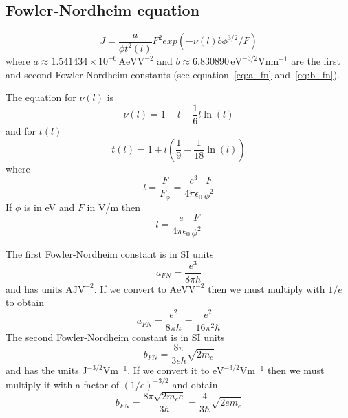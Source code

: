 \documentclass[a4paper,10pt]{article}
\begin{document}
\subsection{Fowler-Nordheim equation}
\begin{equation}
  J = \frac{a}{\phi t^2(l)}F^2 exp(-\nu(l)b\phi^{3/2}/F)
\end{equation}
where \(a \approx 1.541434\times 10^{-6}\,\mathrm{AeVV^{-2}}\) and \(b \approx 6.830890\,\mathrm{eV^{-3/2} V nm^{-1}}\) are
the first and second Fowler-Nordheim constants (see equation~\eqref{eq:a_fn} and~\eqref{eq:b_fn}).

The equation for \(\nu(l)\) is~\cite{Forbes08112007}
\begin{equation}
 \nu(l) = 1 - l + \frac{1}{6}l \ln(l)
\end{equation}
and for \(t(l)\)
\begin{equation}
  t(l) = 1 + l\left( \frac{1}{9} - \frac{1}{18}\ln(l) \right)
\end{equation}
where
\begin{equation}
 l = \frac{F}{F_\phi} = \frac{e^3}{4\pi\epsilon_0} \frac{F}{\phi^2}
\end{equation}
If \(\phi\) is in eV and \(F\) in V/m then
\begin{equation}
  l = \frac{e}{4\pi\epsilon_0} \frac{F}{\phi^2}
\end{equation}

The first Fowler-Nordheim constant is in SI units
\begin{equation}\label{eq:a_fn}
 a_{FN} = \frac{e^3}{8\pi h}
\end{equation}
and has units \(\mathrm{A}\mathrm{J}\mathrm{V}^{-2}\). If we convert to \(\mathrm{A}\mathrm{eV}\mathrm{V}^{-2}\) then
we must multiply with \(1/e\) to obtain
\begin{equation}\label{eq:b_fn}
 a_{FN} = \frac{e^2}{8\pi h} = \frac{e^2}{16\pi^2 \hbar}
\end{equation}
The second Fowler-Nordheim constant is in SI units
\begin{equation}
  b_{FN} = \frac{8\pi}{3eh}\sqrt{2m_e}
\end{equation}
and has the units \(\mathrm{J}^{-3/2}\mathrm{V}\mathrm{m}^{-1}\). If we convert it to \(\mathrm{eV}^{-3/2}\mathrm{V}\mathrm{m}^{-1}\) then
we must multiply it with a factor of \((1/e)^{-3/2}\) and obtain
\begin{equation}
 b_{FN} = \frac{8\pi\sqrt{2m_e e}}{3h} = \frac{4}{3\hbar}\sqrt{2em_e}
\end{equation}
\end{document}
